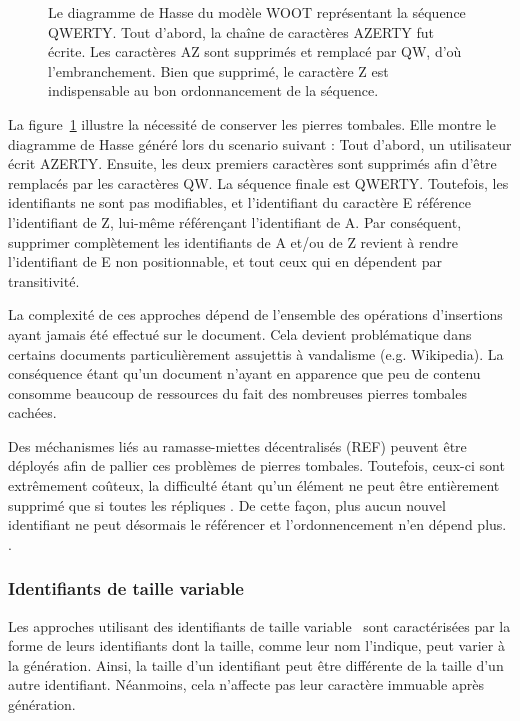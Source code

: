 \begin{figure}
  \centering
  
  \caption{\label{lseq:fig:wootexample}Le diagramme de Hasse du modèle WOOT
    représentant la séquence QWERTY. Tout d'abord, la chaîne de caractères
    AZERTY fut écrite. Les caractères AZ sont supprimés et remplacé par QW, d'où
    l'embranchement. Bien que supprimé, le caractère Z est indispensable au bon
    ordonnancement de la séquence.}
\end{figure}

La figure~\ref{lseq:fig:wootexample} illustre la nécessité de conserver les
pierres tombales. Elle montre le diagramme de Hasse généré lors du scenario
suivant : Tout d'abord, un utilisateur écrit AZERTY. Ensuite, les deux premiers
caractères sont supprimés afin d'être remplacés par les caractères QW. La
séquence finale est QWERTY. Toutefois, les identifiants ne sont pas modifiables,
et l'identifiant du caractère E référence l'identifiant de Z, lui-même
référençant l'identifiant de A. Par conséquent, supprimer complètement les
identifiants de A et/ou de Z revient à rendre l'identifiant de E non
positionnable, et tout ceux qui en dépendent par transitivité.

La complexité de ces approches dépend de l'ensemble des opérations d'insertions
ayant jamais été effectué sur le document. Cela devient problématique dans
certains documents particulièrement assujettis à vandalisme (e.g. Wikipedia). La
conséquence étant qu'un document n'ayant en apparence que peu de contenu
consomme beaucoup de ressources du fait des nombreuses pierres tombales cachées.

Des méchanismes liés au ramasse-miettes décentralisés (REF) peuvent être
déployés afin de pallier ces problèmes de pierres tombales. Toutefois, ceux-ci
sont extrêmement coûteux, la difficulté étant qu'un élément ne peut être
entièrement supprimé que si toutes les répliques . De cette façon, plus aucun nouvel identifiant ne peut désormais le
référencer et l'ordonnencement n'en dépend plus. . 

\subsubsection{Identifiants de taille variable}
\label{lseq:subsubsec:variable}

Les approches utilisant des identifiants de taille
variable~\cite{andre2013supporting, preguica2009commutative, weiss2009logoot}
sont caractérisées par la forme de leurs identifiants dont la taille, comme leur
nom l'indique, peut varier à la génération. Ainsi, la taille d'un identifiant
peut être différente de la taille d'un autre identifiant. Néanmoins, cela
n'affecte pas leur caractère immuable après génération.

